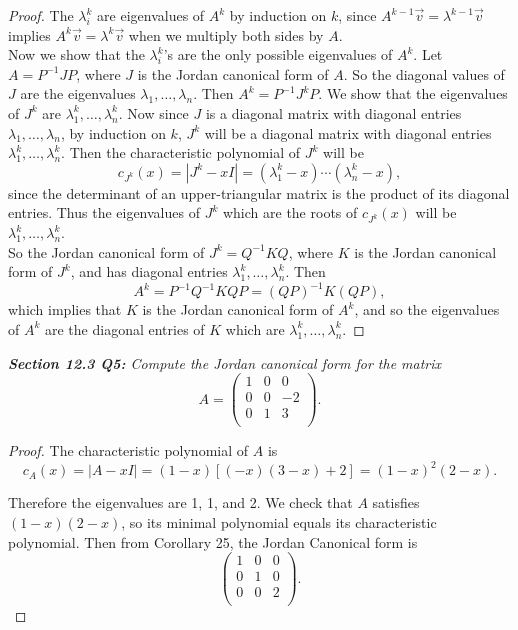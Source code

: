 \documentclass{article}
\begin{document}
  \begin{proof}
    The $\lambda_i^k$ are eigenvalues of $A^k$ by induction on $k$, since
    $A^{k-1}\vec{v}=\lambda^{k-1}\vec{v}$ implies
    $A^{k}\vec{v}=\lambda^{k}\vec{v}$ when we multiply both sides by $A$.
    \\

    Now we show that the $\lambda_i^k$'s are the only possible eigenvalues
    of $A^k$. Let $A=P^{-1}JP$, where $J$ is the Jordan canonical form of
    $A$. So the diagonal values of $J$ are the eigenvalues
    $\lambda_1,\ldots,\lambda_n$. Then $A^k=P^{-1}J^kP$. We show that the
    eigenvalues of $J^k$ are $\lambda_1^k,\ldots,\lambda_n^k$. Now since
    $J$ is a diagonal matrix with diagonal entries
    $\lambda_1,\ldots,\lambda_n$, by induction on $k$, $J^k$ will be a
    diagonal matrix with diagonal entries $\lambda_1^k,\ldots,\lambda_n^k$.
    Then the characteristic polynomial of $J^k$ will be
    \[c_{J^k}(x) =|J^k-xI| =(\lambda_1^k-x) \cdots(\lambda_n^k-x),\]
    since the determinant of an upper-triangular matrix is the product of
    its diagonal entries. Thus the eigenvalues of $J^k$ which are the roots
    of $c_{J^k}(x)$ will be $\lambda_1^k,\ldots,\lambda_n^k$. \\

    So the Jordan canonical form of $J^k=Q^{-1}KQ$, where $K$ is the Jordan
    canonical form of $J^k$, and has diagonal entries
    $\lambda_1^k,\ldots,\lambda_n^k$. Then
    \[A^k =P^{-1}Q^{-1}KQP =(QP)^{-1}K(QP),\]
    which implies that $K$ is the Jordan canonical form of $A^k$, and so
    the eigenvalues of $A^k$ are the diagonal entries of $K$ which are
    $\lambda_1^k,\ldots,\lambda_n^k$.
  \end{proof}

\it \textbf{Section 12.3 Q5:} Compute the Jordan canonical form for the
  matrix
  \[A =\begin{pmatrix}1&0&0\\ 0&0&-2\\ 0&1&3\\ \end{pmatrix}.\]

  \begin{proof}
    The characteristic polynomial of $A$ is
    \[c_A(x) =|A-xI| =(1-x)[(-x)(3-x)+2] =(1-x)^2(2-x).\]

    Therefore the eigenvalues are 1, 1, and 2. We check that $A$
    satisfies $(1-x)(2-x)$, so its minimal polynomial equals its
    characteristic polynomial. Then from Corollary 25, the Jordan Canonical
    form is
    \[\begin{pmatrix} 1&0&0\\ 0&1&0\\ 0&0&2\\ \end{pmatrix}.\]
  \end{proof}
\end{document}
